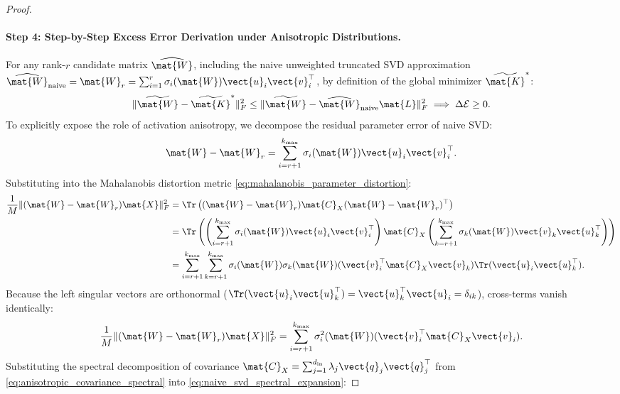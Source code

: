 \begin{proof}
\paragraph{Step 4: Step-by-Step Excess Error Derivation under Anisotropic Distributions.}
For any rank-$r$ candidate matrix $\widehat{\mat{W}}$, including the naive unweighted truncated SVD approximation $\widehat{\mat{W}}_{\text{naive}} = \mat{W}_r = \sum_{i=1}^r \sigma_i(\mat{W}) \vect{u}_i \vect{v}_i^\top$, by definition of the global minimizer $\widetilde{\mat{K}}^*$:
\begin{equation}
\| \widetilde{\mat{W}} - \widetilde{\mat{K}}^* \|_F^2 \le \| \widetilde{\mat{W}} - \widehat{\mat{W}}_{\text{naive}} \mat{L} \|_F^2 \implies \Delta \mathcal{E} \ge 0.
\end{equation}
To explicitly expose the role of activation anisotropy, we decompose the residual parameter error of naive SVD:
\begin{equation}
\mat{W} - \mat{W}_r = \sum_{i=r+1}^{k_{\max}} \sigma_i(\mat{W}) \vect{u}_i \vect{v}_i^\top.
\end{equation}
Substituting into the Mahalanobis distortion metric \eqref{eq:mahalanobis_parameter_distortion}:
\begin{align}
\frac{1}{M} \| (\mat{W} - \mat{W}_r) \mat{X} \|_F^2 &= \Tr\left( (\mat{W} - \mat{W}_r) \mat{C}_X (\mat{W} - \mat{W}_r)^\top \right) \nonumber \\
&= \Tr\left( \left( \sum_{i=r+1}^{k_{\max}} \sigma_i(\mat{W}) \vect{u}_i \vect{v}_i^\top \right) \mat{C}_X \left( \sum_{k=r+1}^{k_{\max}} \sigma_k(\mat{W}) \vect{v}_k \vect{u}_k^\top \right) \right) \nonumber \\
&= \sum_{i=r+1}^{k_{\max}} \sum_{k=r+1}^{k_{\max}} \sigma_i(\mat{W}) \sigma_k(\mat{W}) (\vect{v}_i^\top \mat{C}_X \vect{v}_k) \Tr(\vect{u}_i \vect{u}_k^\top).
\end{align}
Because the left singular vectors are orthonormal ($\Tr(\vect{u}_i \vect{u}_k^\top) = \vect{u}_k^\top \vect{u}_i = \delta_{ik}$), cross-terms vanish identically:
\begin{equation}
\frac{1}{M} \| (\mat{W} - \mat{W}_r) \mat{X} \|_F^2 = \sum_{i=r+1}^{k_{\max}} \sigma_i^2(\mat{W}) (\vect{v}_i^\top \mat{C}_X \vect{v}_i).
\label{eq:naive_svd_spectral_expansion}
\end{equation}
Substituting the spectral decomposition of covariance $\mat{C}_X = \sum_{j=1}^{d_{\text{in}}} \lambda_j \vect{q}_j \vect{q}_j^\top$ from \eqref{eq:anisotropic_covariance_spectral} into \eqref{eq:naive_svd_spectral_expansion}:

\end{proof}

